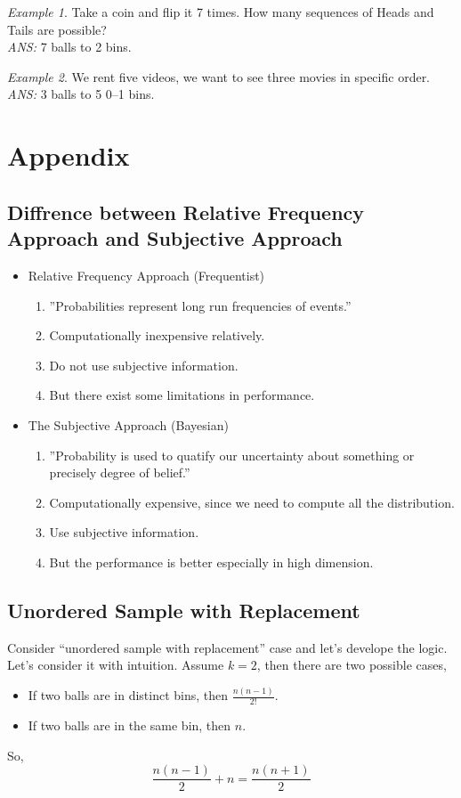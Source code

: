 \documentclass[twoside]{article}
\newcounter{lecnum}
\theoremstyle{definition}
\theoremstyle{remark}
\newtheorem{example}{Example}[lecnum]
\begin{document}
\begin{example}
  Take a coin and flip it 7 times. How many sequences of Heads and Tails are possible?\\
  \textit{ANS:} 7 balls to 2 bins.
\end{example}
\begin{example}
  We rent five videos, we want to see three movies in specific order.\\
  \textit{ANS:} 3 balls to 5 0--1 bins.
\end{example}


\section{Appendix}
\subsection{Diffrence between Relative Frequency Approach and Subjective Approach}
\begin{itemize}
  \item Relative Frequency Approach (Frequentist)
  \begin{enumerate}
    \item ”Probabilities represent long run frequencies of events.”
    \item Computationally inexpensive relatively.
    \item Do not use subjective information.
    \item But there exist some limitations in performance.
  \end{enumerate}
  \item The Subjective Approach (Bayesian)
  \begin{enumerate}
    \item ”Probability is used to quatify our uncertainty about something or precisely degree of belief.”
    \item Computationally expensive, since we need to compute all the distribution.
    \item Use subjective information.
    \item But the performance is better especially in high dimension.
  \end{enumerate}
\end{itemize}

\subsection{Unordered Sample with Replacement}
Consider ``unordered sample with replacement'' case and let's develope the logic.
Let's consider it with intuition. Assume $k = 2$, then there are two possible
cases,
\begin{itemize}
  \setlength\itemsep{0.0em}
  \item If two balls are in distinct bins, then $\frac{n(n-1)}{2!}$.
  \item If two balls are in the same bin, then $n$.
\end{itemize}
So,
$$
\frac{n(n-1)}{2} + n = \frac{n(n+1)}{2}
$$
\end{document}
